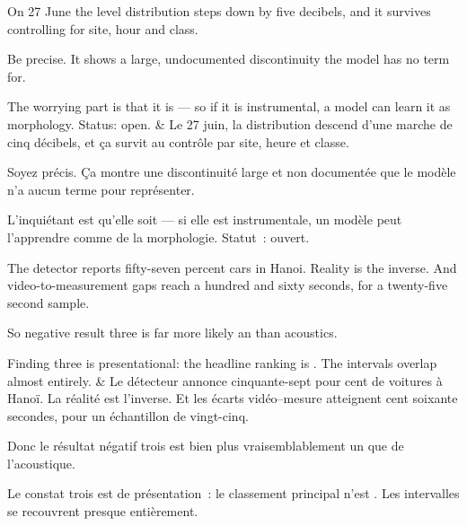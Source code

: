 \documentclass[10pt,a4paper]{article}
\begin{document}
\begin{say}
On 27 June the level distribution steps down by five decibels, and it survives
controlling for site, hour and class.

Be precise.  It shows a large,
undocumented discontinuity the model has no term for.

The worrying part is that it is  --- so if it is
instrumental, a model can learn it as morphology. Status: open.
&
Le 27 juin, la distribution descend d'une marche de cinq décibels, et ça survit au
contrôle par site, heure et classe.

Soyez précis.  Ça montre une
discontinuité large et non documentée que le modèle n'a aucun terme pour
représenter.

L'inquiétant est qu'elle soit  --- si elle est
instrumentale, un modèle peut l'apprendre comme de la morphologie. Statut~:
ouvert.
\end{say}

\begin{say}
The detector reports fifty-seven percent cars in Hanoi. Reality is the inverse.
And video-to-measurement gaps reach a hundred and sixty seconds, for a
twenty-five second sample.

So negative result three is far more likely an  than
acoustics.

Finding three is presentational: the headline ranking is . The intervals overlap almost entirely.
&
Le détecteur annonce cinquante-sept pour cent de voitures à Hanoï. La réalité est
l'inverse. Et les écarts vidéo--mesure atteignent cent soixante secondes, pour un
échantillon de vingt-cinq.

Donc le résultat négatif trois est bien plus vraisemblablement un  que de l'acoustique.

Le constat trois est de présentation~: le classement principal n'est . Les intervalles se recouvrent presque entièrement.
\end{say}
\end{document}
